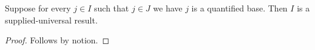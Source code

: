 

\begin{theorem}\label{supplied_negative_extra_guard}
    Suppose for every $j\in I$ such that $j\in J$ we have $j$ is a quantified base.
    Then $I$ is a supplied-universal result.
\end{theorem}
\begin{proof}
    Follows by notion.
\end{proof}
